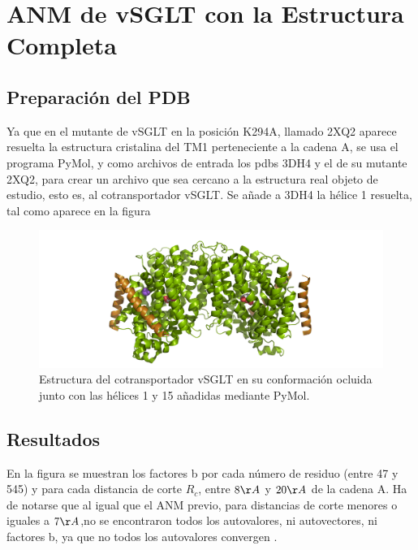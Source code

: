 \section{ANM de vSGLT con la Estructura Completa}
\subsection{Preparaci\'{o}n del PDB}
Ya que en el mutante de vSGLT en la posici\'{o}n K294A, llamado 2XQ2 aparece resuelta la estructura cristalina del TM1 perteneciente a la cadena A, se usa el programa PyMol, y como archivos de entrada los pdbs 3DH4 y el de su mutante 2XQ2, para crear un archivo que sea cercano a la estructura real objeto de estudio, esto es, al cotransportador vSGLT. Se a\~{n}ade a 3DH4 la h\'{e}lice 1 resuelta, tal como aparece en la figura 
\begin{figure}[H]
 \centering
 \includegraphics[scale=0.3]{Kap4/vSGLT_n.png}
 \caption{Estructura del cotransportador vSGLT en su conformaci\'{o}n ocluida junto con las h\'{e}lices 1 y 15 a\~{n}adidas mediante PyMol.}
 \label{fig:vSGLT_in_2}
\end{figure}

\subsection{Resultados}
En la figura \label{fig:ANM_pos}
se muestran los factores b por cada n\'{u}mero de residuo (entre 47 y 545) y para cada distancia de corte $R_c$, entre $8\AA$ y $20\AA$ de la cadena A. Ha de notarse que al igual que el ANM previo, para distancias de corte menores o iguales a $7\AA$,no se encontraron todos  los autovalores, ni autovectores, ni factores b, ya que no todos los autovalores convergen \cite{Zimmermann2011}.\\

